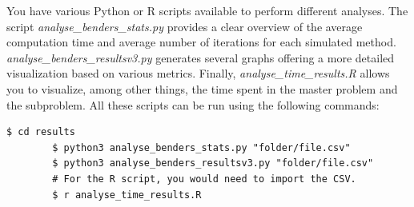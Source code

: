 \documentclass[12pt, a4paper, twoside]{article}
\numberwithin{equation}{section}
\begin{document}
	\noindent You have various Python or R scripts available to perform different analyses. The script \textit{analyse\_benders\_stats.py} provides a clear overview of the average computation time and average number of iterations for each simulated method. \textit{analyse\_benders\_resultsv3.py} generates several graphs offering a more detailed visualization based on various metrics. Finally, \textit{analyse\_time\_results.R} allows you to visualize, among other things, the time spent in the master problem and the subproblem. All these scripts can be run using the following commands:
	
	\begin{lstlisting}[style=terminal]
		$ cd results
		$ python3 analyse_benders_stats.py "folder/file.csv"
		$ python3 analyse_benders_resultsv3.py "folder/file.csv"
		# For the R script, you would need to import the CSV.
		$ r analyse_time_results.R
	\end{lstlisting}




    
	
	
\end{document}
